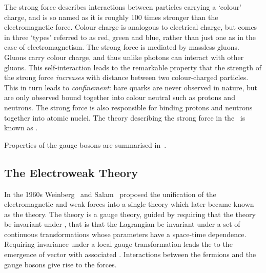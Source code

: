 The strong force describes interactions between particles carrying a `colour'
charge, and is so named as it is roughly 100 times stronger than the electromagnetic
force. Colour charge is analogous to electrical charge, but comes in three
`types' referred to as red, green and blue, rather than just one as in
the case of electromagnetism. The strong force is mediated by massless gluons. Gluons carry
colour charge, and thus unlike photons can interact with other gluons. This
self-interaction leads to the remarkable property that the strength of the strong force {\it
increases} with distance between two colour-charged particles. This in turn leads to {\it
confinement}: bare quarks are never observed in nature, but are only observed
bound together into colour neutral  such as protons and neutrons. 
The strong force is also responsible for binding protons and neutrons together
into atomic nuclei. The theory describing the strong force in the \sm\ is known
as .

Properties of the gauge bosons are summarised in~.




\subsection{The Electroweak Theory}

In the 1960s Weinberg~\cite{PhysRevLett.19.1264} and Salam~\cite{Salam1964168} proposed the unification of the electromagnetic
and weak forces into a single theory which later became known as the
 theory. The theory is a gauge theory, guided by requiring that the theory be
invariant under , that is that the Lagrangian
be invariant under a set of continuous transformations whose parameters have a space-time dependence. 
Requiring invariance under a local gauge transformation leads the to the emergence of
vector  with associated . Interactions
between the fermions and the gauge bosons give rise to the forces.

